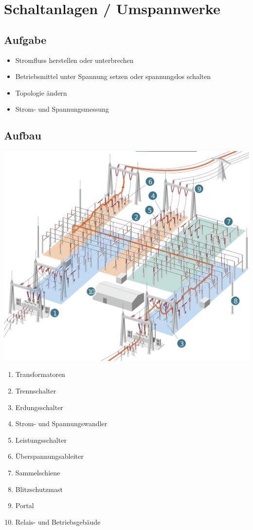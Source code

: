 \newpage
\section{Schaltanlagen / Umspannwerke}

\subsection{Aufgabe}

\begin{itemize}
    \item Stromfluss herstellen oder unterbrechen
    \item Betriebsmittel unter Spannung setzen oder spannungslos schalten
    \item Topologie ändern
    \item Strom- und Spannungsmessung
\end{itemize}

\subsection{Aufbau}

\begin{center}
    \includegraphics[width=0.98\columnwidth]{images/Aufbau_Schaltanlagen_1.png}
\end{center}

\begin{enumerate}
    \item Transformatoren
    \item Trennschalter
    \item Erdungsschalter
    \item Strom- und Spannungswandler
    \item Leistungsschalter
    \item Überspannungsableiter
    \item Sammelschiene
    \item Blitzschutzmast
    \item Portal
    \item Relais- und Betriebsgebäude
\end{enumerate}


